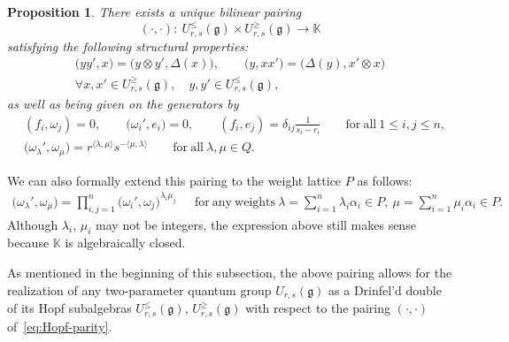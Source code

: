 \documentclass[10pt,a4paper]{amsart}
\numberwithin{equation}{section}
\newtheorem{Proposition}[Theorem]{Proposition}
 { \theoremstyle{definition}
\newtheorem{Definition}[Theorem]{Definition}
\newtheorem{Note}[Theorem]{Note}
\newtheorem{Example}[Theorem]{Example}
\newtheorem{Remark}[Theorem]{Remark} }
\newcommand{\fg}{\mathfrak{g}}
\begin{document}
\begin{Proposition}\label{prop:pairing_2param}
There exists a unique bilinear pairing
\begin{equation}\label{eq:Hopf-parity}
 (\cdot,\cdot)\colon\ U_{r,s}^{\le}(\fg) \times U_{r,s}^{\ge}(\fg) \to \mathbb{K}
\end{equation}
satisfying the following structural properties:
{\samepage\begin{gather}
 \bigl(yy',x\bigr) = \bigl(y \otimes y',\Delta(x)\bigr), \qquad \bigl(y, xx'\bigr) = \bigl(\Delta(y),x' \otimes x\bigr)\nonumber\\
 \forall x,x' \in U_{r,s}^{\ge}(\fg),\quad y,y' \in U_{r,s}^{\le}(\fg),\label{eq:Hopf-properties}
\end{gather}
as well as being given on the generators by}
\begin{align}
 & (f_{i},\omega_{j}) = 0, \qquad \bigl(\omega_{i}', e_{i}\bigr) = 0, \qquad
 (f_{i},e_{j}) = \delta_{ij}\frac{1}{s_{i} - r_{i}} \qquad \mathrm{for\ all} \ 1\leq i,j\leq n , \nonumber\\
 & \bigl(\omega_{\lambda}',\omega_{\mu}\bigr) = r^{\langle \lambda,\mu\rangle}s^{-\langle \mu,\lambda \rangle}
 \qquad \mathrm{for\ all} \ \lambda,\mu\in Q.\label{eq:generators-parity}
\end{align}
\end{Proposition}

We can also formally extend this pairing to the weight lattice $P$ as follows:
\begin{gather}
 \bigl(\omega_{\lambda}',\omega_{\mu}\bigr) = \prod_{i,j = 1}^{n}\bigl(\omega_{i}',\omega_{j}\bigr)^{\lambda_{i}\mu_{j}} \quad \ \
\mathrm{for\ any\ weights} \
 \lambda = \sum_{i = 1}^{n} \lambda_{i}\alpha_{i}\in P,\ \mu = \sum_{i = 1}^{n} \mu_{i}\alpha_{i} \in P.\label{eq:weight-pairing}
\end{gather}
Although $\lambda_{i}$, $\mu_{i}$ may not be integers, the expression above still makes sense because $\mathbb{K}$ is algebraically closed.

\begin{Remark}
As mentioned in the beginning of this subsection, the above pairing allows for the realization of any two-parameter quantum group $U_{r,s}(\fg)$ as a Drinfel’d double of its Hopf subalgebras $U^{\leq}_{r,s}(\fg)$, $U^{\geq}_{r,s}(\fg)$ with respect to the pairing $(\cdot,\cdot)$ of~\eqref{eq:Hopf-parity}.
\end{Remark}
\end{document}
